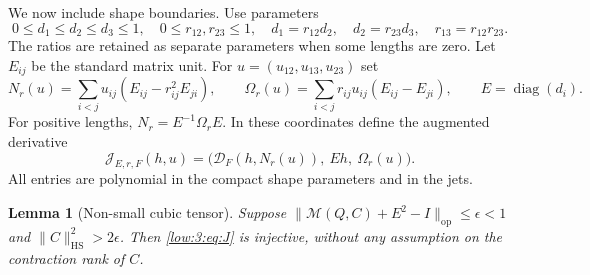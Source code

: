 \documentclass[11pt]{amsart}
\newtheorem{lemma}[theorem]{Lemma}
\theoremstyle{definition}
\theoremstyle{remark}
\newcommand{\norm}[1]{\lVert #1\rVert}
\DeclareMathOperator{\diag}{diag}
\numberwithin{equation}{section}
\begin{document}
We now include shape boundaries. Use parameters
\begin{equation}\label{low:3:eq:compact-shapes}
0\leq d_1\leq d_2\leq d_3\leq1,\quad 0\leq r_{12},r_{23}\leq1,\quad d_1=r_{12}d_2,\quad d_2=r_{23}d_3,\quad r_{13}=r_{12}r_{23}.
\end{equation}
The ratios are retained as separate parameters when some lengths are zero. Let $E_{ij}$ be the standard matrix unit. For $u=(u_{12},u_{13},u_{23})$ set
\begin{equation}\label{low:3:eq:shape-fields}
N_r(u)=\sum_{i<j}u_{ij}(E_{ij}-r_{ij}^2E_{ji}),\qquad \Omega_r(u)=\sum_{i<j}r_{ij}u_{ij}(E_{ij}-E_{ji}),\qquad E=\diag(d_i).
\end{equation}
For positive lengths, $N_r=E^{-1}\Omega_rE$. In these coordinates define the augmented derivative
\begin{equation}\label{low:3:eq:J}
\mathcal J_{E,r,F}(h,u)=\bigl(\mathcal D_F(h,N_r(u)),\ Eh,\ \Omega_r(u)\bigr).
\end{equation}
All entries are polynomial in the compact shape parameters and in the jets.

\begin{lemma}[Non-small cubic tensor]\label{low:3:lem:non-small}
Suppose $\norm{\mathscr M(Q,C)+E^2-I}_{\mathrm{op}}\leq\epsilon<1$ and $\norm C_{\mathrm{HS}}^2>2\epsilon$. Then \eqref{low:3:eq:J} is injective, without any assumption on the contraction rank of $C$.
\end{lemma}
\end{document}
